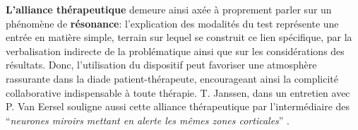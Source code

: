 \begin{itemize}
 
 \textbf{L'alliance thérapeutique} demeure ainsi axée à proprement parler
 sur
 un phénomène de \textbf{résonance}:  l'explication des modalités du test représente une
 entrée en matière simple, terrain  sur lequel se construit ce lien spécifique,
 par la verbalisation indirecte de la problématique ainsi que sur
 les considérations des résultats.
 Donc, l'utilisation
 du dispositif peut favoriser une atmosphère rassurante dans la diade
 patient-thérapeute, encourageant ainsi la complicité collaborative
 indispensable à toute
 thérapie.
 T. Janssen, dans un entretien
 avec P. Van Eersel
 souligne aussi cette alliance thérapeutique
 par l'intermédiaire des ``\textit{neurones
 	miroirs mettant en alerte les mêmes zones corticales}'' \autocite[203]{van_eersel_cerveau}.
 

\end{itemize}
